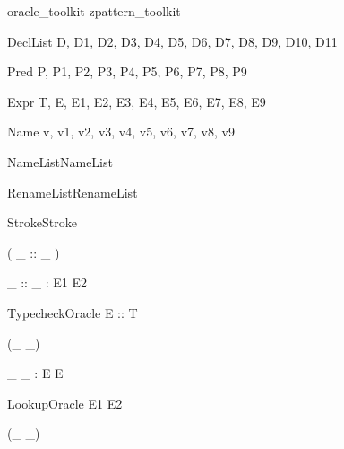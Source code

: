 \documentclass{article}
\begin{document}
\begin{zsection}
  \SECTION oracle\_toolkit \parents zpattern\_toolkit
\end{zsection}

\begin{zedjoker}{DeclList} D, D1, D2, D3, D4, D5, D6, D7, D8, D9, D10, D11 \end{zedjoker}
\begin{zedjoker}{Pred} P, P1, P2, P3, P4, P5, P6, P7, P8, P9 \end{zedjoker}
\begin{zedjoker}{Expr} T, E, E1, E2, E3, E4, E5, E6, E7, E8, E9 \end{zedjoker}
\begin{zedjoker}{Name} v, v1, v2, v3, v4, v5, v6, v7, v8, v9 \end{zedjoker}
\begin{zedjoker}{NameList}NameList\end{zedjoker}
\begin{zedjoker}{RenameList}RenameList\end{zedjoker}
\begin{zedjoker}{Stroke}Stroke\end{zedjoker}

\begin{zed}
  \relation ( \_ :: \_ )
\end{zed}

\begin{gendef}[E1,E2]
  \_ :: \_ : E1 \rel E2
\end{gendef}

\begin{zedoracle}{TypecheckOracle}
  E :: T
\end{zedoracle}




\begin{zed}
  \relation (\_ \hasDefn \_)
\end{zed}

\begin{gendef}[E]
  \_ \hasDefn \_ : E \rel E
\end{gendef}

\begin{zedoracle}{LookupOracle}
  E1 \hasDefn E2
\end{zedoracle}




\begin{zed}
  \relation (\_ \is \_)
\end{zed}
\end{document}
